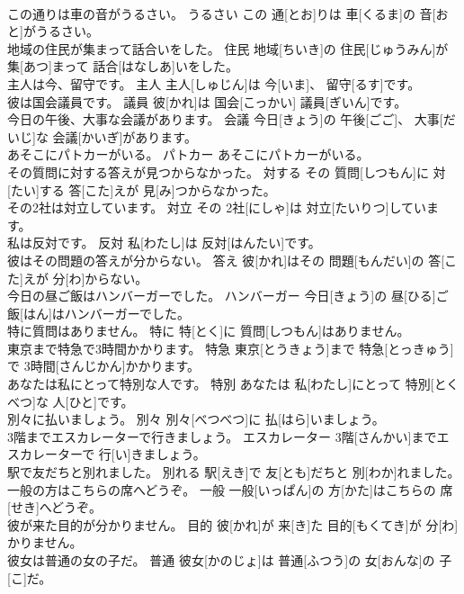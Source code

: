 \documentclass[8pt]{extreport}
\begin{document}
\begin{CJK}{UTF8}{min}
\\	この通りは車の音がうるさい。	うるさい	この 通[とお]りは 車[くるま]の 音[おと]がうるさい。	
\\	地域の住民が集まって話合いをした。	住民	地域[ちいき]の 住民[じゅうみん]が 集[あつ]まって 話合[はなしあ]いをした。	
\\	主人は今、留守です。	主人	主人[しゅじん]は 今[いま]、 留守[るす]です。	
\\	彼は国会議員です。	議員	彼[かれ]は 国会[こっかい] 議員[ぎいん]です。	
\\	今日の午後、大事な会議があります。	会議	今日[きょう]の 午後[ごご]、 大事[だいじ]な 会議[かいぎ]があります。	
\\	あそこにパトカーがいる。	パトカー	あそこにパトカーがいる。	
\\	その質問に対する答えが見つからなかった。	対する	その 質問[しつもん]に 対[たい]する 答[こた]えが 見[み]つからなかった。	
\\	その2社は対立しています。	対立	その 2社[にしゃ]は 対立[たいりつ]しています。	
\\	私は反対です。	反対	私[わたし]は 反対[はんたい]です。	
\\	彼はその問題の答えが分からない。	答え	彼[かれ]はその 問題[もんだい]の 答[こた]えが 分[わ]からない。	
\\	今日の昼ご飯はハンバーガーでした。	ハンバーガー	今日[きょう]の 昼[ひる]ご 飯[はん]はハンバーガーでした。	
\\	特に質問はありません。	特に	特[とく]に 質問[しつもん]はありません。	
\\	東京まで特急で3時間かかります。	特急	東京[とうきょう]まで 特急[とっきゅう]で 3時間[さんじかん]かかります。	
\\	あなたは私にとって特別な人です。	特別	あなたは 私[わたし]にとって 特別[とくべつ]な 人[ひと]です。	
\\	別々に払いましょう。	別々	別々[べつべつ]に 払[はら]いましょう。	
\\	3階までエスカレーターで行きましょう。	エスカレーター	3階[さんかい]までエスカレーターで 行[い]きましょう。	
\\	駅で友だちと別れました。	別れる	駅[えき]で 友[とも]だちと 別[わか]れました。	
\\	一般の方はこちらの席へどうぞ。	一般	一般[いっぱん]の 方[かた]はこちらの 席[せき]へどうぞ。	
\\	彼が来た目的が分かりません。	目的	彼[かれ]が 来[き]た 目的[もくてき]が 分[わ]かりません。	
\\	彼女は普通の女の子だ。	普通	彼女[かのじょ]は 普通[ふつう]の 女[おんな]の 子[こ]だ。	

\end{CJK}
\end{document}
